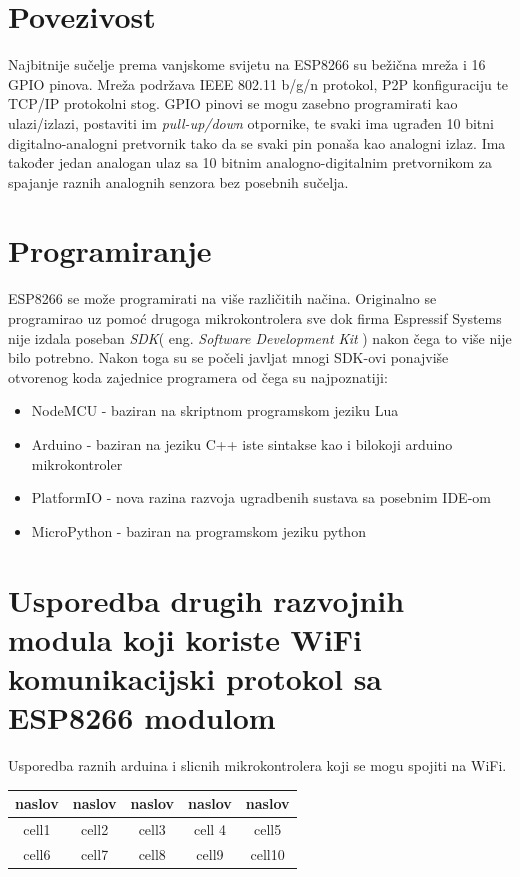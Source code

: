 \documentclass[times, utf8, zavrsni]{fer}
\begin{document}
\section{Povezivost}
Najbitnije sučelje prema vanjskome svijetu na ESP8266 su bežična mreža i 16 GPIO pinova.
Mreža podržava IEEE 802.11 b/g/n protokol, P2P konfiguraciju te TCP/IP protokolni stog.
GPIO pinovi se mogu zasebno programirati kao ulazi/izlazi, postaviti im \textit{pull-up/down} otpornike, te svaki ima ugrađen 10 bitni digitalno-analogni pretvornik tako da se svaki pin ponaša kao analogni izlaz.
Ima također jedan analogan ulaz sa 10 bitnim analogno-digitalnim pretvornikom za spajanje raznih analognih senzora bez posebnih sučelja.

\section{Programiranje}
ESP8266 se može programirati na više različitih načina.
Originalno se programirao uz pomoć drugoga mikrokontrolera sve dok firma Espressif Systems nije izdala poseban \textit{SDK}(  eng. \textit{Software Development Kit} ) nakon čega to više nije bilo potrebno.
Nakon toga su se počeli javljat mnogi SDK-ovi ponajviše otvorenog koda zajednice programera od čega su najpoznatiji:
    \begin{itemize}
        \item NodeMCU - baziran na skriptnom programskom jeziku Lua
        \item Arduino - baziran na jeziku C++ iste sintakse kao i bilokoji arduino mikrokontroler
        \item PlatformIO - nova razina razvoja ugradbenih sustava sa posebnim IDE-om
        \item MicroPython - baziran na programskom jeziku python
    \end{itemize}

\section{Usporedba drugih razvojnih modula koji koriste WiFi komunikacijski protokol sa ESP8266 modulom}
Usporedba raznih arduina i slicnih mikrokontrolera koji se mogu spojiti na WiFi.

\begin{center}
    \begin{tabular}{ |c|c|c|c|c| }
        \hline
        \textbf{naslov} & \textbf{naslov} & \textbf{naslov} & \textbf{naslov} & \textbf{naslov} \\
        \hline
        cell1 & cell2 & cell3 & cell 4 & cell5\\
        \hline
        cell6 & cell7 & cell8 & cell9 & cell10 \\
        \hline
    \end{tabular}
\end{center}
\end{document}
